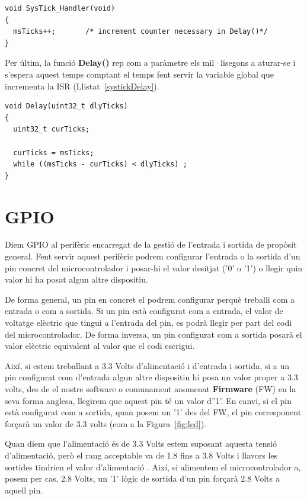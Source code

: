 \begin{lstlisting}[caption={ISR del {\em Systick}},style=customc,label=systickISR]
void SysTick_Handler(void)
{
  msTicks++;       /* increment counter necessary in Delay()*/
}
\end{lstlisting}

Per últim, la funció {\bf Delay()} rep com a paràmetre els mil·lisegons a aturar-se i s'espera aquest temps comptant el temps fent servir la variable global que incrementa la ISR (Llistat~\ref{systickDelay}).

\begin{lstlisting}[caption={Funció delay() amb {\em Systick}},style=customc,label=systickDelay]
void Delay(uint32_t dlyTicks)
{
  uint32_t curTicks;

  curTicks = msTicks;
  while ((msTicks - curTicks) < dlyTicks) ;
}
\end{lstlisting}



\chapter{GPIO}
\label{sub:GPIO_2}
Diem \gls{GPIO} al perifèric encarregat de la gestió de l'entrada i sortida de propòsit general. Fent servir aquest perifèric podrem configurar l'entrada o la sortida d'un pin concret del microcontrolador i posar-hi el valor desitjat ('0' o '1') o llegir quin valor hi ha posat algun altre dispositiu.

De forma general, un pin en concret el podrem configurar perquè treballi com a entrada o com a sortida. Si un pin està configurat com a entrada, el valor de voltatge elèctric que tingui a l'entrada del pin, es podrà llegir per part del codi del microcontrolador. De forma inversa, un pin configurat com a sortida posarà el valor elèctric equivalent al valor que el codi escrigui.

Així, si estem treballant a 3.3 Volts d'alimentació i d'entrada i sortida, si a un pin configurat com d'entrada algun altre dispositiu
hi posa un valor proper a 3.3 volts, des de el nostre software o comunament anomenat \textbf{Firmware} (\gls{FW}) en la seva forma anglesa, llegirem que aquest pin té un valor d''1'. En canvi, si el pin està configurat com a sortida, quan posem un '1' des del \gls{FW}, el pin corresponent forçarà un valor de 3.3 volts (com a la Figura~\ref{fig:led}).

\begin{remark}
 Quan diem que l'alimentació és de 3.3 Volts estem suposant aquesta tensió d'alimentació, però el rang acceptable va de 1.8 fins a 3.8 Volts i llavors les sortides tindrien el valor d'alimentació \cite[9]{EFM32TG840}. Així, si alimentem el microcontrolador a, posem per cas, 2.8 Volts, un '1' lògic de sortida d'un pin forçarà 2.8 Volts a aquell pin.
\end{remark}



